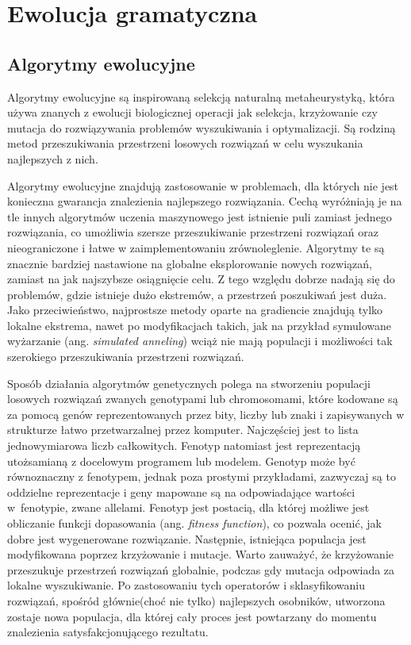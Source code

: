 
\section{Ewolucja gramatyczna}
\label{sec:ewolucjaGramatyczna}
\subsection{Algorytmy ewolucyjne}
Algorytmy ewolucyjne \cite{EA} są inspirowaną selekcją naturalną metaheurystyką, która używa znanych z ewolucji biologicznej operacji jak selekcja, krzyżowanie czy mutacja do rozwiązywania problemów wyszukiwania i optymalizacji. Są rodziną metod przeszukiwania przestrzeni losowych rozwiązań w celu wyszukania najlepszych z nich. 

Algorytmy ewolucyjne znajdują zastosowanie w problemach, dla których nie jest konieczna gwarancja znalezienia najlepszego rozwiązania. Cechą wyróżniają je na tle innych algorytmów uczenia maszynowego jest istnienie puli zamiast jednego rozwiązania, co umożliwia szersze przeszukiwanie przestrzeni rozwiązań oraz nieograniczone i łatwe w zaimplementowaniu zrównoleglenie. Algorytmy te są znacznie bardziej nastawione na globalne eksplorowanie nowych rozwiązań, zamiast na jak najszybsze osiągnięcie celu. Z tego względu dobrze nadają się do problemów, gdzie istnieje dużo ekstremów, a przestrzeń poszukiwań jest duża. Jako przeciwieństwo, najprostsze metody oparte na gradiencie znajdują tylko lokalne ekstrema, nawet po modyfikacjach takich, jak na przykład symulowane wyżarzanie (ang. \textit{simulated anneling}) wciąż nie mają populacji i możliwości tak szerokiego przeszukiwania przestrzeni rozwiązań.

Sposób działania algorytmów genetycznych polega na stworzeniu populacji losowych rozwiązań zwanych genotypami lub chromosomami, które kodowane są za pomocą genów reprezentowanych przez bity, liczby lub znaki i zapisywanych w strukturze łatwo przetwarzalnej przez komputer. Najczęściej jest to lista jednowymiarowa liczb całkowitych. Fenotyp natomiast jest reprezentacją utożsamianą z docelowym programem lub modelem. Genotyp może być równoznaczny z fenotypem, jednak poza prostymi przykładami, zazwyczaj są to oddzielne reprezentacje i geny mapowane są na odpowiadające wartości w~fenotypie, zwane allelami. Fenotyp jest postacią, dla której możliwe jest obliczanie funkcji dopasowania (ang. \textit{fitness function}), co pozwala ocenić, jak dobre jest wygenerowane rozwiązanie. Następnie, istniejąca populacja jest modyfikowana poprzez krzyżowanie i mutacje. Warto zauważyć, że krzyżowanie przeszukuje przestrzeń rozwiązań globalnie, podczas gdy mutacja odpowiada za lokalne wyszukiwanie. Po zastosowaniu tych operatorów i sklasyfikowaniu rozwiązań, spośród głównie(choć nie tylko) najlepszych osobników, utworzona zostaje nowa populacja, dla której cały proces jest powtarzany do momentu znalezienia satysfakcjonującego rezultatu.

